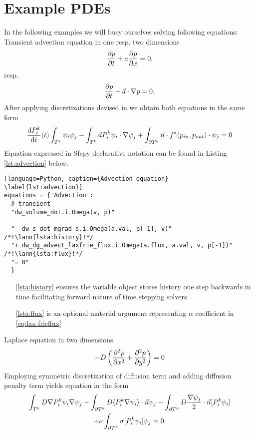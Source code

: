 \section{Example PDEs}
In the following examples we will busy ourselves solving following equations:\\
Transient advection equation in one resp. two dimensions
\begin{equation}
	\label{eq:ex_advection}
	\frac{\partial p}{\partial t} + a\frac{\partial p}{\partial x} = 0,
\end{equation}
resp.
\begin{equation}
	\frac{\partial p}{\partial t} + \vec{a}\cdot\nabla{p} = 0.
\end{equation}
After applying discretizations devised in  we obtain both equations in 
the same form
\begin{equation}
		 \frac{\text{d}P^k_i}{\text{d}t}(t)\int_{T^k}\psi_i\psi_j 
		 - \int_{T^k} \vec{a}P_i^k\psi_i\cdot\nabla\psi_j 
		 + \int_{\partial{T^k}} \vec{n}
		\cdot f^{*} (p_{in}, p_{out})\cdot\psi_j = 0
\end{equation}
Equation expressed in Sfepy declarative notation can be found in Listing 
\ref{lst:advection} below;
\setcounter{lstannotation}{0}
\begin{lstlisting}[language=Python, caption={Advection equation}
\label{lst:advection}]
equations = {'Advection': 
  # transient
  "dw_volume_dot.i.Omega(v, p)"
 
  "- dw_s_dot_mgrad_s.i.Omega(a.val, p[-1], v)" /*!\lann{lsta:history}!*/
  "+ dw_dg_advect_laxfrie_flux.i.Omega(a.flux, a.val, v, p[-1])"  /*!\lann{lsta:flux}!*/
  "= 0"
  }
\end{lstlisting}
\begin{itemize}
	\item[\ref{lsta:history}]  ensures the variable object stores 
	history one step backwards in time facilitating forward nature of time stepping 
	solvers
	\item[\ref{lsta:flux}]  is an optional material argument 
	representing $\alpha$ coefficient in \eqref{eq:lax-frieflux}
\end{itemize}
Laplace equation in two dimensions
\begin{equation}
	\label{eq:ex_laplace}
	- D \left(\frac{\partial^2 p}{\partial x^2} + \frac{\partial^2 p}{\partial y^2} \right)= 0
\end{equation}
Employing symmetric discretization of diffusion term and adding diffusion penalty term 
yields equation in the form
\begin{multline}
	\int_{T^k} D\nabla P^k_i\psi_i \nabla \psi_j
	- \int_{\partial T^k} D \langle P^k_i\nabla\psi_i\rangle \cdot \vec{n}\psi_j 
    - \int_{\partial T^k} D \frac{\nabla \psi_j}{2}\cdot \vec{n} [P^k_i\psi_i] \\ 
    + \nu \int_{\partial T^k} \sigma [P^k_i\psi_i]\psi_j 
    = 0.
\end{multline}
